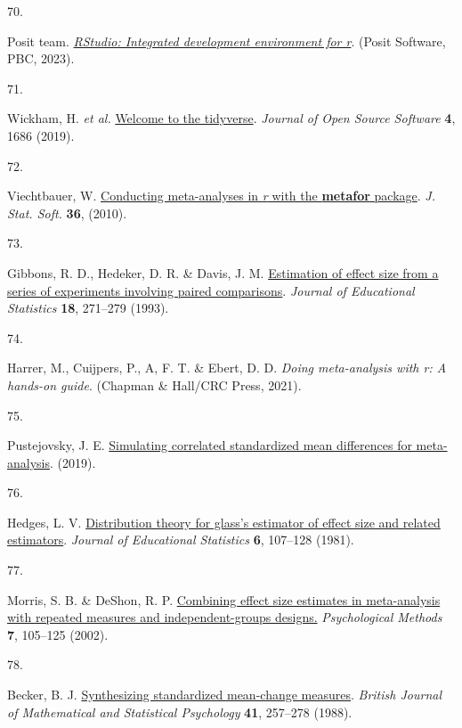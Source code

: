 \documentclass[
  man]{apa6}
\newlength{\cslhangindent}
\newlength{\csllabelwidth}
\newenvironment{CSLReferences}[2] %
 {\begin{list}{}{%
  \setlength{\itemindent}{0pt}
  \setlength{\leftmargin}{0pt}
  \setlength{\parsep}{0pt}
  \ifodd #1
   \setlength{\leftmargin}{\cslhangindent}
   \setlength{\itemindent}{-1\cslhangindent}
  \fi
  \setlength{\itemsep}{#2\baselineskip}}}
 {\end{list}}
\newcommand{\CSLLeftMargin}[1]{\parbox[t]{\csllabelwidth}{\strut#1\strut}}
\newcommand{\CSLRightInline}[1]{\parbox[t]{\linewidth - \csllabelwidth}{\strut#1\strut}}
\begin{document}
\begin{CSLReferences}{0}{0}
\CSLLeftMargin{70. }%
\CSLRightInline{Posit team. \emph{\href{http://www.posit.co/}{RStudio: Integrated development environment for r}}. (Posit Software, PBC, 2023).}

\CSLLeftMargin{71. }%
\CSLRightInline{Wickham, H. \emph{et al.} \href{https://doi.org/10.21105/joss.01686}{Welcome to the tidyverse}. \emph{Journal of Open Source Software} \textbf{4}, 1686 (2019).}

\CSLLeftMargin{72. }%
\CSLRightInline{Viechtbauer, W. \href{https://doi.org/10.18637/jss.v036.i03}{Conducting meta-analyses in \emph{r} with the \textbf{metafor} package}. \emph{J. Stat. Soft.} \textbf{36}, (2010).}

\CSLLeftMargin{73. }%
\CSLRightInline{Gibbons, R. D., Hedeker, D. R. \& Davis, J. M. \href{https://doi.org/10.3102/10769986018003271}{Estimation of effect size from a series of experiments involving paired comparisons}. \emph{Journal of Educational Statistics} \textbf{18}, 271--279 (1993).}

\CSLLeftMargin{74. }%
\CSLRightInline{Harrer, M., Cuijpers, P., A, F. T. \& Ebert, D. D. \emph{Doing meta-analysis with r: A hands-on guide}. (Chapman \& Hall/CRC Press, 2021).}

\CSLLeftMargin{75. }%
\CSLRightInline{Pustejovsky, J. E. \href{https://www.jepusto.com/simulating-correlated-smds/}{Simulating correlated standardized mean differences for meta-analysis}. (2019).}

\CSLLeftMargin{76. }%
\CSLRightInline{Hedges, L. V. \href{https://doi.org/10.3102/10769986006002107}{Distribution theory for glass's estimator of effect size and related estimators}. \emph{Journal of Educational Statistics} \textbf{6}, 107--128 (1981).}

\CSLLeftMargin{77. }%
\CSLRightInline{Morris, S. B. \& DeShon, R. P. \href{https://doi.org/10.1037/1082-989X.7.1.105}{Combining effect size estimates in meta-analysis with repeated measures and independent-groups designs.} \emph{Psychological Methods} \textbf{7}, 105--125 (2002).}

\CSLLeftMargin{78. }%
\CSLRightInline{Becker, B. J. \href{https://doi.org/10.1111/j.2044-8317.1988.tb00901.x}{Synthesizing standardized mean-change measures}. \emph{British Journal of Mathematical and Statistical Psychology} \textbf{41}, 257--278 (1988).}


\end{CSLReferences}
\end{document}
